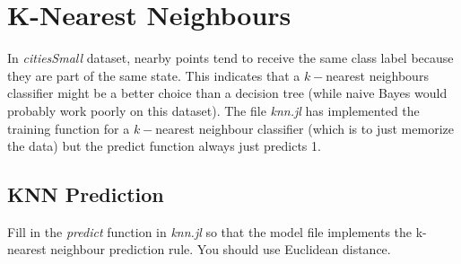 \documentclass{article}
\begin{document}
\section{K-Nearest Neighbours}


In \emph{citiesSmall} dataset, nearby points tend to receive the same class label because they are part of the same state. This indicates that a $k-$nearest neighbours classifier might be a better choice than a decision tree (while naive Bayes would probably work poorly on this dataset). The file \emph{knn.jl} has implemented the training function for a $k-$nearest neighbour classifier (which is to just memorize the data) but the predict function always just predicts 1.


\subsection{KNN Prediction}

Fill in the \emph{predict} function in \emph{knn.jl} so that the model file implements the k-nearest neighbour prediction rule. You should use Euclidean distance. 
\end{document}
